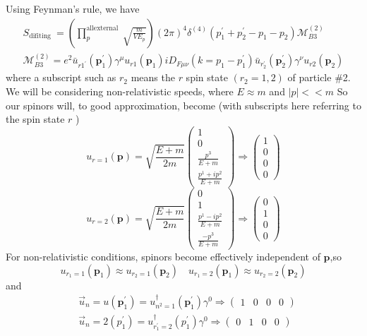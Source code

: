 Using Feynman's rule, we have
\begin{equation}\begin{array}{l}
S_{\text {difiting }}=\left(\prod_{p}^{\text {allexternal }} \sqrt{\frac{m}{V E_{p}}}\right)(2 \pi)^{4} \delta^{(4)}\left(p_{1}^{\prime}+p_{2}^{\prime}-p_{1}-p_{2}\right) \mathcal{M}_{B 3}^{(2)} \\
\mathcal{M}_{B 3}^{(2)}=e^{2} \bar{u}_{r1^{\prime}}\left(\mathbf{p}_{1}^{\prime}\right) \gamma^{\mu} u_{r1}\left(\mathbf{p}_{1}\right) i D_{F \mu \nu}\left(k=p_{1}-p_{1}^{\prime}\right) \bar{u}_{r_{2}^{\prime}}\left(\mathbf{p}_{2}^{\prime}\right) \gamma^{\nu} u_{r2}\left(\mathbf{p}_{2}\right) 
\end{array}\end{equation}
where a subscript such as $r_{2}$ means the $r$ spin state $\left(r_{2}=1,2\right)$ of particle \#2. We will be considering non-relativistic speeds, where $E \approx m$ and $|p|<<m$ So our spinors will, to good approximation, become (with subscripts here referring to the spin state $r$ )
$$u_{r=1}(\mathbf{p})=\sqrt{\frac{E+m}{2 m}}\left(\begin{array}{c}
1 \\
0 \\
\frac{p^{3}}{E+m} \\
\frac{p^{1}+i p^{2}}{E+m}
\end{array}\right) \Rightarrow\left(\begin{array}{l}
1 \\
0 \\
0 \\
0
\end{array}\right)$$
$$u_{r=2}(\mathbf{p})=\sqrt{\frac{E+m}{2 m}}\left(\begin{array}{c}
0 \\
1 \\
\frac{p^{1}-i p^{2}}{E+m} \\
\frac{-p^{3}}{E+m}
\end{array}\right) \Rightarrow\left(\begin{array}{l}
0 \\
1 \\
0 \\
0
\end{array}\right)$$
For non-relativistic conditions, spinors become effectively independent of $\mathbf{p}$,so
$$u_{r_{1}=1}\left(\mathbf{p}_{1}\right) \approx u_{r_{2}=1}\left(\mathbf{p}_{2}\right) \quad u_{r_{1}=2}\left(\mathbf{p}_{1}\right) \approx u_{r_{2}=2}\left(\mathbf{p}_{2}\right)$$
and
$$\begin{aligned}
&\vec{u}_{n}=u\left(\mathbf{p}_{1}^{\prime}\right)=u_{n^{2}=1}^{\dagger}\left(\mathbf{p}_{1}^{\prime}\right) \gamma^{0} \Rightarrow\left(\begin{array}{llll}
1 & 0 & 0 & 0
\end{array}\right)\\
&\vec{u}_{n}=2\left(p_{1}^{\prime}\right)=u_{r_{1}^{\prime}=2}^{\dagger}\left(p_{1}^{\prime}\right) \gamma^{0} \Rightarrow\left(\begin{array}{llll}
0 & 1 & 0 & 0
\end{array}\right)
\end{aligned}$$
